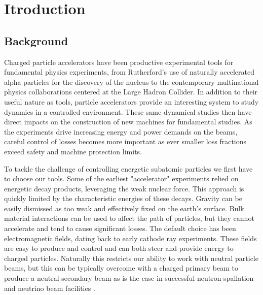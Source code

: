 \chapter{Itroduction} \label{chap:intro}

\section{Background} \label{sec:back}
Charged particle accelerators have been productive experimental tools for fundamental physics experiments, from Rutherford's use of naturally accelerated alpha particles for the discovery of the nucleus to the contemporary multinational physics collaborations centered at the Large Hadron Collider.  In addition to their useful nature as tools, particle accelerators provide an interesting system to study dynamics in a controlled environment. These same dynamical studies then have direct impacts on the construction of new machines for fundamental studies. As the experiments drive increasing energy and power demands on the beams, careful control of losses becomes more important as ever smaller loss fractions exceed safety and machine protection limits.

To tackle the challenge of controlling energetic subatomic particles we first have to choose our tools. Some of the earliest "accelerator" experiments relied on energetic decay products, leveraging the weak nuclear force. This approach is quickly limited by the characteristic energies of these decays. Gravity can be easily dismissed as too weak and effectively fixed on the earth's surface. Bulk material interactions can be used to affect the path of particles, but they cannot accelerate and tend to cause significant losses. The default choice has been electromagnetic fields, dating back to early cathode ray experiments. These fields are easy to produce and control and can both steer and provide energy to charged particles. Naturally this restricts our ability to work with neutral particle beams, but this can be typically overcome with a charged primary beam to produce a neutral secondary beam as is the case in successful neutron spallation and neutrino beam facilities \cite{SNS} \cite{NuMI}.

